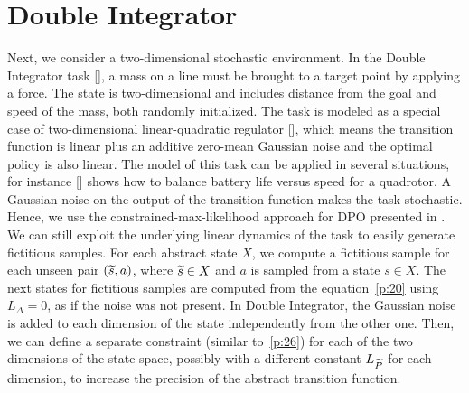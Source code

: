 \section{Double Integrator} \label{sec:mass}
Next, we consider a two-dimensional stochastic environment. In the Double Integrator task [\cite{recht2018tour}], a mass on a line must be brought to a target point by applying a force. The state is two-dimensional and includes distance from the goal and speed of the mass, both randomly initialized. The task is modeled as a special case of two-dimensional linear-quadratic regulator [\cite{peters2002policy}], which means the transition function is linear plus an additive zero-mean Gaussian noise and the optimal policy is also linear. The model of this task can be applied in several situations, for instance [\cite{recht2018tour}] shows how to balance battery life versus speed for a quadrotor. A Gaussian noise on the output of the transition function makes the task stochastic. Hence, we use the constrained-max-likelihood approach for \ac{DPO} presented in . We can still exploit the underlying linear dynamics of the task to easily generate fictitious samples. For each abstract state $X$, we compute a fictitious sample for each unseen pair $(\widetilde{s}, a)$, where $\widetilde{s} \in X$ and $a$ is sampled from a state $s \in X$. The next states for fictitious samples are computed from the equation~\eqref{p:20} using $L_{\Delta}=0$, as if the noise was not present. In Double Integrator, the Gaussian noise is added to each dimension of the state independently from the other one. Then, we can define a separate constraint (similar to~\eqref{p:26}) for each of the two dimensions of the state space, possibly with a different constant $L_{\widetilde{P}}$ for each dimension, to increase the precision of the abstract transition function. 

